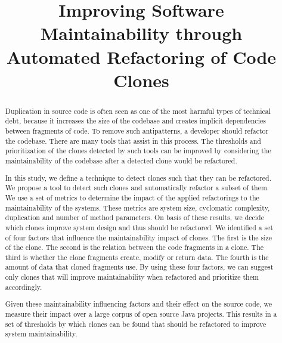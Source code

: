 \documentclass[conference]{IEEEtran}
\begin{document}
\title{Improving Software Maintainability through Automated Refactoring of Code Clones}

\author{
\and
{}
}

\maketitle

\begin{abstract}
Duplication in source code is often seen as one of the most harmful types of technical debt, because it increases the size of the codebase and creates implicit dependencies between fragments of code. To remove such antipatterns, a developer should refactor the codebase. There are many tools that assist in this process. The thresholds and prioritization of the clones detected by such tools can be improved by considering the maintainability of the codebase after a detected clone would be refactored.

In this study, we define a technique to detect clones such that they can be refactored. We propose a tool to detect such clones and automatically refactor a subset of them. We use a set of metrics to determine the impact of the applied refactorings to the maintainability of the systems. These metrics are system size, cyclomatic complexity, duplication and number of method parameters. On basis of these results, we decide which clones improve system design and thus should be refactored. We identified a set of four factors that influence the maintainability impact of clones. The first is the size of the clone. The second is the relation between the code fragments in a clone. The third is whether the clone fragments create, modify or return data. The fourth is the amount of data that cloned fragments use. By using these four factors, we can suggest only clones that will improve maintainability when refactored and prioritize them accordingly.

Given these maintainability influencing factors and their effect on the source code, we measure their impact over a large corpus of open source Java projects. This results in a set of thresholds by which clones can be found that should be refactored to improve system maintainability.
\end{abstract}
\end{document}
